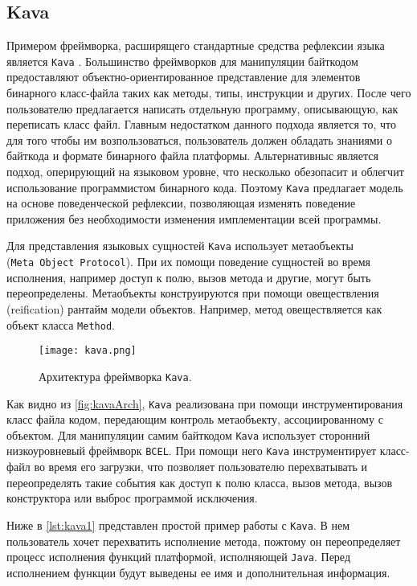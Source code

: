 \subsection{Kava}

Примером фреймворка, расширящего стандартные средства рефлексии языка является \texttt{Kava} \cite{kava1} \cite{kava2}. Большинство фреймворков для манипуляции байткодом предоставляют объектно-ориентированное представление для элементов бинарного класс-файла таких как методы, типы, инструкции и других. После чего пользователю предлагается написать отдельную программу, описывающую, как переписать класс файл. Главным недостатком данного подхода является то, что для того чтобы им возпользоваться, пользователь должен обладать знаниями о байткода и формате бинарного файла платформы. Альтернативныс является подход, оперирующий на языковом уровне, что несколько обезопасит и облегчит использование программистом бинарного кода. Поэтому \texttt{Kava} предлагает модель на основе поведенческой рефлексии, позволяющая изменять поведение приложения без необходимости изменения имплементации всей программы.

Для представления языковых сущностей \texttt{Kava} использует метаобъекты (\texttt{Meta~Object~Protocol}). При их помощи поведение сущностей во время исполнения, например доступ к полю, вызов метода и другие, могут быть переопределены. Метаобъекты конструируются при помощи овеществления (reification) рантайм модели объектов. Например, метод овеществляется как объект класса \texttt{Method}.

\begin{figure}[h]
\centering
\texttt{[image: kava.png]}
\caption{Архитектура фреймворка \texttt{Kava}.}
\label{fig:kavaArch}
\end{figure}

Как видно из \autoref{fig:kavaArch}, \texttt{Kava} реализована при помощи инструментирования класс файла кодом, передающим контроль метаобъекту, ассоциированному с объектом. Для манипуляции самим байткодом \texttt{Kava} использует сторонний низкоуровневый фреймворк \texttt{BCEL}. При помощи него \texttt{Kava} инструментирует класс-файл во время его загрузки, что позволяет пользователю перехватывать и переопределять такие события как доступ к полю класса, вызов метода, вызов конструктора или выброс программой исключения.

Ниже в \autoref{lst:kava1} представлен простой пример работы с \texttt{Kava}. В нем пользователь хочет перехватить исполнение метода, пожтому он переопределяет процесс исполнения функций платформой, исполняющей \texttt{Java}. Перед исполнением функции будут выведены ее имя и дополнительная информация.


